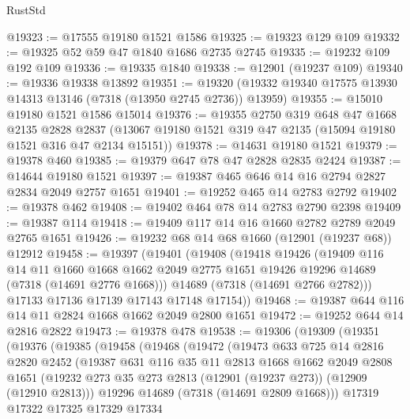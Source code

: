 \begin{lexlean}{RustStd}
\begin{coremodule}
@19323 := @17555 @19180 @1521 @1586
@19325 := @19323 @129 @109
@19332 := @19325 @52 @59 @47 @1840 @1686 @2735 @2745
@19335 := @19232 @109 @192 @109
@19336 := @19335 @1840
@19338 := @12901 (@19237 @109)
@19340 := @19336 @19338 @13892
@19351 := @19320 (@19332 @19340 @17575 @13930 @14313 @13146 (@7318 (@13950 @2745 @2736)) @13959)
@19355 := @15010 @19180 @1521 @1586 @15014
@19376 := @19355
    @2750
    @319
    @648
    @47
    @1668
    @2135
    @2828
    @2837
    (@13067 @19180 @1521 @319 @47 @2135 (@15094 @19180 @1521 @316 @47 @2134 @15151))
@19378 := @14631 @19180 @1521
@19379 := @19378 @460
@19385 := @19379 @647 @78 @47 @2828 @2835 @2424
@19387 := @14644 @19180 @1521
@19397 := @19387 @465 @646 @14 @16 @2794 @2827 @2834 @2049 @2757 @1651
@19401 := @19252 @465 @14 @2783 @2792
@19402 := @19378 @462
@19408 := @19402 @464 @78 @14 @2783 @2790 @2398
@19409 := @19387 @114
@19418 := @19409 @117 @14 @16 @1660 @2782 @2789 @2049 @2765 @1651
@19426 := @19232 @68 @14 @68 @1660 (@12901 (@19237 @68)) @12912
@19458 := @19397
    (@19401
      (@19408
        (@19418
          @19426
          (@19409
            @116
            @14
            @11
            @1660
            @1668
            @1662
            @2049
            @2775
            @1651
            @19426
            @19296
            @14689
            (@7318 (@14691 @2776 @1668)))
          @14689
          (@7318 (@14691 @2766 @2782)))
        @17133
        @17136
        @17139
        @17143
        @17148
        @17154))
@19468 := @19387 @644 @116 @14 @11 @2824 @1668 @1662 @2049 @2800 @1651
@19472 := @19252 @644 @14 @2816 @2822
@19473 := @19378 @478
@19538 := @19306
    (@19309
      (@19351
        (@19376
          (@19385
            (@19458
              (@19468
                (@19472
                  (@19473
                    @633
                    @725
                    @14
                    @2816
                    @2820
                    @2452
                    (@19387
                      @631
                      @116
                      @35
                      @11
                      @2813
                      @1668
                      @1662
                      @2049
                      @2808
                      @1651
                      (@19232 @273 @35 @273 @2813 (@12901 (@19237 @273)) (@12909 (@12910 @2813)))
                      @19296
                      @14689
                      (@7318 (@14691 @2809 @1668)))
                    @17319
                    @17322
                    @17325
                    @17329
                    @17334

\end{coremodule}
\end{lexlean}
